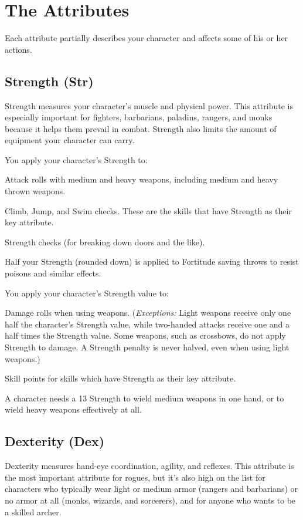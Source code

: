 \section{The Attributes}
Each attribute partially describes your character and affects some of his or her actions.

\subsection{Strength (Str)}
Strength measures your character's muscle and physical power. This attribute is especially important for fighters, barbarians, paladins, rangers, and monks because it helps them prevail in combat. Strength also limits the amount of equipment your character can carry.

You apply your character's Strength to:
\begin{itemize*}
\item Attack rolls with medium and heavy weapons, including medium and heavy thrown weapons.
\item Climb, Jump, and Swim checks. These are the skills that have Strength as their key attribute.
\item Strength checks (for breaking down doors and the like).
\item Half your Strength (rounded down) is applied to Fortitude saving throws to resist poisons and similar effects.
\end{itemize*}
You apply your character's Strength value to:
\begin{itemize*}
\item Damage rolls when using weapons. (\emph{Exceptions:} Light weapons receive only one half the character's Strength value, while two-handed attacks receive one and a half times the Strength value. Some weapons, such as crossbows, do not apply Strength to damage. A Strength penalty is never halved, even when using light weapons.)
\item Skill points for skills which have Strength as their key attribute.
\end{itemize*}
\par A character needs a 13 Strength to wield medium weapons in one hand, or to wield heavy weapons effectively at all.

\subsection{Dexterity (Dex)}
Dexterity measures hand-eye coordination, agility, and reflexes. This attribute is the most important attribute for rogues, but it's also high on the list for characters who typically wear light or medium armor (rangers and barbarians) or no armor at all (monks, wizards, and sorcerers), and for anyone who wants to be a skilled archer.

